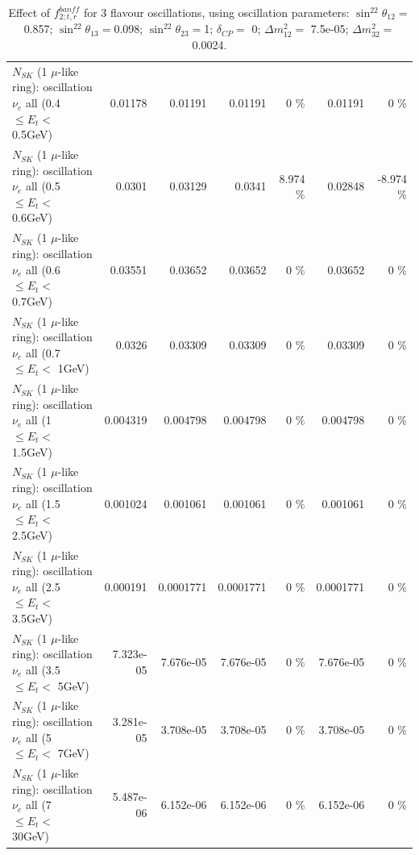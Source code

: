 \begin{table}
\begin{tabular}{| l | r | r | r  r | r  r |}
$N_{SK}$ (1 $\mu$-like ring): oscillation $\nu_{e}$ all (0.4 $\leq E_{t} <$ 0.5GeV) &         0.01178 &         0.01191 &         0.01191 &        0 \%  &         0.01191 &        0 \%  \\ 
$N_{SK}$ (1 $\mu$-like ring): oscillation $\nu_{e}$ all (0.5 $\leq E_{t} <$ 0.6GeV) &          0.0301 &         0.03129 &          0.0341 &    8.974 \%  &         0.02848 &   -8.974 \%  \\ 
$N_{SK}$ (1 $\mu$-like ring): oscillation $\nu_{e}$ all (0.6 $\leq E_{t} <$ 0.7GeV) &         0.03551 &         0.03652 &         0.03652 &        0 \%  &         0.03652 &        0 \%  \\ 
$N_{SK}$ (1 $\mu$-like ring): oscillation $\nu_{e}$ all (0.7 $\leq E_{t} <$ 1GeV) &          0.0326 &         0.03309 &         0.03309 &        0 \%  &         0.03309 &        0 \%  \\ 
$N_{SK}$ (1 $\mu$-like ring): oscillation $\nu_{e}$ all (1 $\leq E_{t} <$ 1.5GeV) &        0.004319 &        0.004798 &        0.004798 &        0 \%  &        0.004798 &        0 \%  \\ 
$N_{SK}$ (1 $\mu$-like ring): oscillation $\nu_{e}$ all (1.5 $\leq E_{t} <$ 2.5GeV) &        0.001024 &        0.001061 &        0.001061 &        0 \%  &        0.001061 &        0 \%  \\ 
$N_{SK}$ (1 $\mu$-like ring): oscillation $\nu_{e}$ all (2.5 $\leq E_{t} <$ 3.5GeV) &        0.000191 &       0.0001771 &       0.0001771 &        0 \%  &       0.0001771 &        0 \%  \\ 
$N_{SK}$ (1 $\mu$-like ring): oscillation $\nu_{e}$ all (3.5 $\leq E_{t} <$ 5GeV) &       7.323e-05 &       7.676e-05 &       7.676e-05 &        0 \%  &       7.676e-05 &        0 \%  \\ 
 $N_{SK}$ (1 $\mu$-like ring): oscillation $\nu_{e}$ all (5 $\leq E_{t} <$ 7GeV) &       3.281e-05 &       3.708e-05 &       3.708e-05 &        0 \%  &       3.708e-05 &        0 \%  \\ 
$N_{SK}$ (1 $\mu$-like ring): oscillation $\nu_{e}$ all (7 $\leq E_{t} <$ 30GeV) &       5.487e-06 &       6.152e-06 &       6.152e-06 &        0 \%  &       6.152e-06 &        0 \%  \\ 
\hline
\hline
\end{tabular}
\caption{ Effect of $f_{2; t, r}^{banff}$ for 3 flavour oscillations, using oscillation parameters:  $\sin^22\theta_{12} = $0.857; $\sin^22\theta_{13} = $0.098; $\sin^22\theta_{23} = $1; $\delta_{CP} = $        0; $\Delta m^2_{12} = $    7.5e-05; $\Delta m^2_{32} = $    0.0024. }
\label{tab:num_banff_02_1RmuT_3f_osc_t13:0.098}
\end{table}
